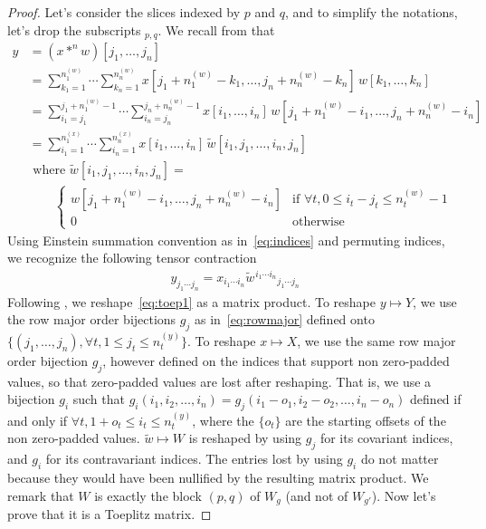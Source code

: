 \begin{proof}
Let's consider the slices indexed by $p$ and $q$, and to simplify the notations, let's drop the subscripts $\hspace{0pt}_{p,q}$. We recall from  that
\begin{align*}
  y &= (x \ast^n w)[j_1, \ldots, j_n] \\
 &= \displaystyle \sum_{k_1=1}^{n_1^{(w)}} \cdots \sum_{k_n=1}^{n_n^{(w)}}
    x[j_1 + n_1^{(w)} - k_1, \ldots, j_n + n_n^{(w)} - k_n] \hspace{2pt} w[k_1, \ldots, k_n] \\
 &= \displaystyle \sum_{i_1=j_1}^{j_1 + n_1^{(w)} - 1} \cdots \sum_{i_n=j_n}^{j_n + n_n^{(w)} - 1}
    x[i_1, \ldots, i_n] \hspace{2pt} w[j_1 + n_1^{(w)} - i_1, \ldots, j_n + n_n^{(w)} - i_n] \\
 &= \displaystyle \sum_{i_1=1}^{n_1^{(x)}} \cdots \sum_{i_n=1}^{n_n^{(x)}}
    x[i_1, \ldots, i_n] \hspace{2pt} \widetilde{w}[i_1, j_1, \ldots, i_n, j_n] \\
 & \text{ where } \widetilde{w}[i_1, j_1, \ldots, i_n, j_n] = \\
 & \quad \quad
 \begin{cases}
   w[j_1 + n_1^{(w)} - i_1, \ldots, j_n + n_n^{(w)} - i_n] & \text{if } \forall t, 0 \le i_t - j_t \le n_t^{(w)} - 1 \\
   0 & \text{otherwise}
 \end{cases}
\end{align*}
Using Einstein summation convention as in~\eqref{eq:indices} and permuting indices, we recognize the following tensor contraction
\begin{align}
y_{j_1 \cdots j_n} = x_{i_1 \cdots i_n} \widetilde{w} \hspace{1pt}^{i_1 \cdots i_n} \hspace{0pt}_{j_1 \cdots j_n} \label{eq:toep1}
\end{align}
Following , we reshape~\eqref{eq:toep1} as a matrix product. To reshape $y \mapsto Y$, we use the row major order bijections $g_j$ as in~\eqref{eq:rowmajor} defined onto $\{(j_1, \ldots, j_n), \forall t, 1 \le j_t \le n_t^{(y)}\}$. To reshape $x \mapsto X$, we use the same row major order bijection $g_j$, however defined on the indices that support non zero-padded values, so that zero-padded values are lost after reshaping. That is, we use a bijection $g_i$ such that $g_i(i_1, i_2, \ldots, i_n) = g_j(i_1 - o_1, i_2 - o_2, \ldots, i_n - o_n)$ defined if and only if $\forall t, 1 + o_t \le i_t \le n_t^{(y)}$, where the $\{o_t\}$ are the starting offsets of the non zero-padded values. $\widetilde{w} \mapsto W$ is reshaped by using $g_j$ for its covariant indices, and $g_i$ for its contravariant indices. The entries lost by using $g_i$ do not matter because they would have been nullified by the resulting matrix product. We remark that $W$ is exactly the block $(p,q)$ of $W_g$ (and not of $W_{g'}$). Now let's prove that it is a Toeplitz matrix.


\end{proof}
